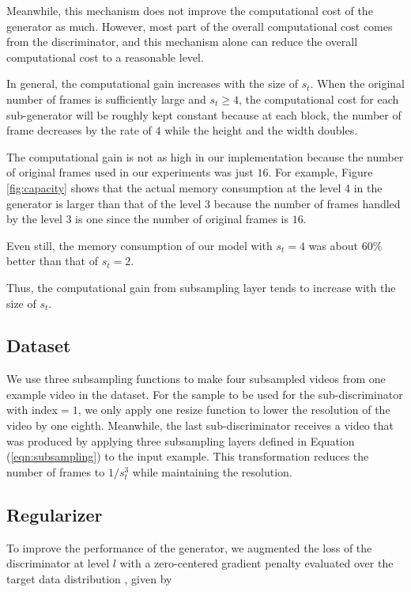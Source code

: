 \documentclass[twocolumn]{svjour3}
\def\Eq#1{Equation (\ref{eqn:#1})}
\def\Fig#1{Figure \ref{fig:#1}}
\begin{document}
Meanwhile, this mechanism does not improve the computational cost of the generator as much.
However, most part of the overall computational cost comes from the discriminator,
and this mechanism alone can reduce the overall computational cost to a reasonable level.














In general, the computational gain increases with the size of $s_t$.
When the original number of frames is sufficiently large and $s_t \geq 4$, the computational cost for each sub-generator will be roughly kept constant because at each block, the number of frame decreases by the rate of $4$ while the height and the width doubles.




The computational gain is not as high in our implementation because the number of original frames used in our experiments was just $16$.
For example, \Fig{capacity} shows that the actual memory consumption at the level 4 in the generator is larger than that of the level 3 because the number of frames handled by the level 3 is one since the number of original frames is $16$.

Even still, the memory consumption of our model with $s_t=4$ was about $60\%$ better than that of $s_t=2$.



Thus, the computational gain from subsampling layer tends to increase with the size of $s_t$.


\subsection{Dataset}
We use three subsampling functions to make four subsampled videos from one example video in the dataset. For the sample to be used for the sub-discriminator with index$=1$, we only apply one resize function to lower the resolution of the video by one eighth.
Meanwhile, the last sub-discriminator receives a video that was produced by applying three subsampling layers defined in \Eq{subsampling} to the input example.
This transformation reduces the number of frames to $1 / s_t^3$ while maintaining the resolution.


\subsection{Regularizer}
To improve the performance of the generator, we augmented the loss of the discriminator at level $l$ with a zero-centered gradient penalty evaluated over the target data distribution \cite{Mescheder2018}, given by
\end{document}
